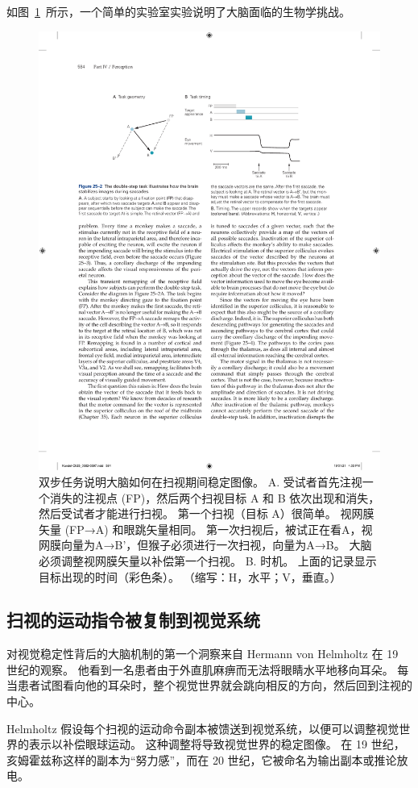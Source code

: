如图~\ref{fig:25_2}~所示，一个简单的实验室实验说明了大脑面临的生物学挑战。


\begin{figure}[htbp]
	\centering
	\includegraphics[width=0.75\linewidth]{chap25/fig_25_2}
	\caption{双步任务说明大脑如何在扫视期间稳定图像。 A. 受试者首先注视一个消失的注视点 (FP)，然后两个扫视目标 A 和 B 依次出现和消失，然后受试者才能进行扫视。 第一个扫视（目标 A）很简单。 视网膜矢量 (FP→A) 和眼跳矢量相同。 第一次扫视后，被试正在看A，视网膜向量为A→B'，但猴子必须进行一次扫视，向量为A→B。 大脑必须调整视网膜矢量以补偿第一个扫视。 B. 时机。 上面的记录显示目标出现的时间（彩色条）。 （缩写：H，水平；V，垂直。）}
	\label{fig:25_2}
\end{figure}



\subsection{扫视的运动指令被复制到视觉系统}

对视觉稳定性背后的大脑机制的第一个洞察来自 Hermann von Helmholtz 在 19 世纪的观察。
他看到一名患者由于外直肌麻痹而无法将眼睛水平地移向耳朵。
每当患者试图看向他的耳朵时，整个视觉世界就会跳向相反的方向，然后回到注视的中心。


Helmholtz 假设每个扫视的运动命令副本被馈送到视觉系统，以便可以调整视觉世界的表示以补偿眼球运动。
这种调整将导致视觉世界的稳定图像。
在 19 世纪，亥姆霍兹称这样的副本为“努力感”，而在 20 世纪，它被命名为输出副本或推论放电。


